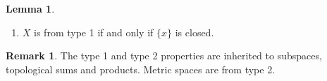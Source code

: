 \documentclass[a4paper]{book}
\theoremstyle{definition}
\newtheorem{lemma}{Lemma}[definition]
\newtheorem*{remark}{Remark}
\begin{document}
    \begin{lemma}
        \begin{enumerate}
            \item \(X\) is from type 1 if and only if \(\{x\}\) is closed.
        \end{enumerate}
    \end{lemma}
    \begin{remark}
        The type 1 and type 2 properties are inherited to subspaces, topological sums and products.
        Metric spaces are from type 2.
    \end{remark}
\end{document}
